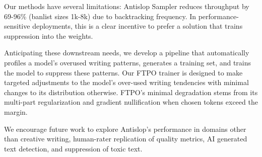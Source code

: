 \documentclass[11pt]{article}
\begin{document}
Our methods have several limitations: Antislop Sampler reduces throughput by 69-96\% (banlist sizes 1k-8k) due to backtracking frequency. In performance-sensitive deployments, this is a clear incentive to prefer a solution that trains suppression into the weights. 

Anticipating these downstream needs, we develop a pipeline that automatically profiles a model's overused writing patterns, generates a training set, and trains the model to suppress these patterns. Our FTPO trainer is designed to make targeted adjustments to the model's over-used writing tendencies with minimal changes to its distribution otherwise. FTPO's minimal degradation stems from its multi-part regularization and gradient nullification when chosen tokens exceed the margin.

We encourage future work to explore Antislop's performance in domains other than creative writing, human-rater replication of quality metrics, AI generated text detection, and suppression of toxic text.




\end{document}
